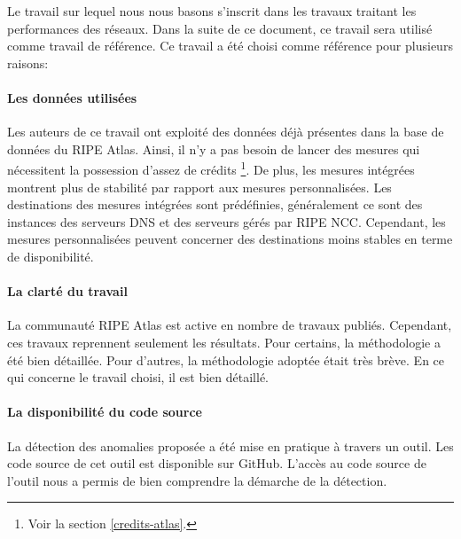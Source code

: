 Le travail sur lequel nous nous basons \cite{DBLP:journals/corr/FontugneAPB16} s'inscrit dans les travaux traitant les performances des réseaux. Dans la suite de ce document, ce travail sera utilisé comme travail de référence.  Ce travail a été choisi comme référence pour plusieurs raisons:


	
\paragraph{Les données utilisées}  Les auteurs de ce travail ont exploité des données déjà présentes dans la base de données du RIPE Atlas. Ainsi, il n'y a pas besoin de lancer des mesures qui nécessitent la possession d'assez de crédits \footnote{Voir la section \ref{credits-atlas}.}. De plus, les mesures intégrées montrent plus de stabilité par rapport aux mesures personnalisées. Les destinations des mesures intégrées sont prédéfinies, généralement ce sont des instances des serveurs DNS et des serveurs gérés par  RIPE NCC. Cependant, les mesures personnalisées peuvent concerner des destinations moins stables en terme de disponibilité.
	
\paragraph{La clarté du travail} La communauté RIPE Atlas est active en nombre de travaux publiés. Cependant, ces travaux reprennent seulement les résultats. Pour certains,  la méthodologie a été bien détaillée. Pour d'autres, la méthodologie adoptée était très brève. En ce qui concerne le  travail choisi, il  est bien détaillé.
	
\paragraph{La disponibilité du code source} La détection des anomalies proposée a été mise en pratique à travers un outil. Les code source de cet outil est disponible sur GitHub\cite{InternetHealthReport}. L'accès au code source de l'outil nous a permis de bien comprendre la démarche de la détection.

	
